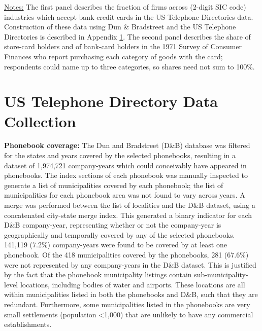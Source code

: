 \documentclass[12pt,english]{article}
\begin{document}
\begin{table}[!ht] 
\caption{Usage of Bank Cards Across Industries, 1970-1977}\label{tab:card_uses}
\resizebox{.55\textwidth}{!}{}
\quad
\resizebox{.45\textwidth}{!}{}
\uline{Notes:} The first panel describes the fraction of firms across (2-digit SIC code) industries which accept bank credit cards in the US Telephone Directories data. Construction of these data using Dun \& Bradstreet and the US Telephone Directories is described in Appendix \ref{sec:construction}. The second panel describes the share of store-card holders and of bank-card holders in the 1971 Survey of Consumer Finances who report purchasing each category of goods with the card; respondents could name up to three categories, so shares need not sum to 100\%. 
\end{table}

\newpage 

\section{US Telephone Directory Data Collection}\label{sec:construction}

\textbf{Phonebook coverage:}
The Dun and Bradstreet (D\&B) database was filtered for the states and years covered by the selected phonebooks, resulting in a dataset of 1,974,721 company-years which could conceivably have appeared in phonebooks. The index sections of each phonebook was manually inspected to generate a list of municipalities covered by each phonebook; the list of municipalities for each phonebook area was not found to vary across years. A merge was performed between the list of localities and the D\&B dataset, using a concatenated city-state merge index. This generated a binary indicator for each D\&B company-year, representing whether or not the company-year is geographically and temporally covered by any of the selected phonebooks. 141,119 (7.2\%) company-years were found to be covered by at least one phonebook. Of the 418 municipalities covered by the phonebooks, 281 (67.6\%) were not represented by any company-years in the D\&B dataset. This is justified by the fact that the phonebook municipality listings contain sub-municipality-level locations, including bodies of water and airports. These locations are all within municipalities listed in both the phonebooks and D\&B, such that they are redundant. Furthermore, some municipalities listed in the phonebooks are very small settlements (population <1,000) that are unlikely to have any commercial establishments.
\end{document}
